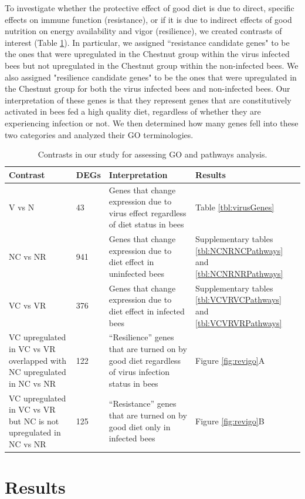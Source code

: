 \documentclass[11pt,a4paper,oldfontcommands,openany]{memoir}
\numberwithin{equation}{section} %
\begin{document}
To investigate whether the protective effect of good diet is due to direct, specific effects on immune function (resistance), or if it is due to indirect effects of good nutrition on energy availability and vigor (resilience), we created contrasts of interest (Table \ref{tbl:contrasts}). In particular, we assigned ``resistance candidate genes" to be the ones that were upregulated in the Chestnut group within the virus infected bees but not upregulated in the Chestnut group within the non-infected bees. We also assigned "resilience candidate genes" to be the ones that were upregulated in the Chestnut group for both the virus infected bees and non-infected bees. Our interpretation of these genes is that they represent genes that are constitutively activated in bees fed a high quality diet, regardless of whether they are experiencing infection or not. We then determined how many genes fell into these two categories and analyzed their GO terminologies.

\begin{table}[H]
\begin{tabular}{ | m{4.4cm} | m{0.9cm}| m{5.5cm} | m{2.6cm} | } 
\hline
Contrast & DEGs & Interpretation & Results \\ 
\hline
V vs N & 43 & Genes that change expression due to virus effect regardless of diet status in bees & Table \ref{tbl:virusGenes} \\ 
\hline
NC vs NR & 941 & Genes that change expression due to diet effect in uninfected bees & Supplementary tables \ref{tbl:NCNRNCPathways} and \ref{tbl:NCNRNRPathways} \\ 
\hline
VC vs VR & 376 & Genes that change expression due to diet effect in infected bees & Supplementary tables \ref{tbl:VCVRVCPathways} and \ref{tbl:VCVRVRPathways} \\ 
\hline
VC upregulated in VC vs VR overlapped with NC upregulated in NC vs NR & 122 & ``Resilience'' genes that are turned on by good diet regardless of virus infection status in bees & Figure \ref{fig:revigo}A \\
\hline
VC upregulated in VC vs VR but NC is not upregulated in NC vs NR & 125 & ``Resistance'' genes that are turned on by good diet only in infected bees & Figure \ref{fig:revigo}B \\
\hline
\end{tabular}
\caption{Contrasts in our study for assessing GO and pathways analysis.}
  \label{tbl:contrasts}
\end{table}


\section{Results}
\end{document}
